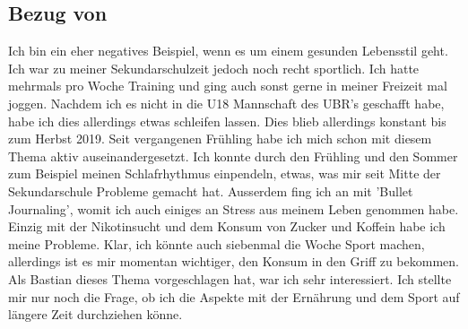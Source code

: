 \subsection{Bezug von \jonas}
\chapterauthor{\jonas}
\label{bezug:jonas}
Ich bin ein eher negatives Beispiel, wenn es um einem gesunden Lebensstil geht. Ich war zu meiner Sekundarschulzeit jedoch noch recht sportlich. Ich hatte mehrmals pro Woche Training und ging auch sonst gerne in meiner Freizeit mal joggen. Nachdem ich es nicht in die U18 Mannschaft des UBR's geschafft habe, habe ich dies allerdings etwas schleifen lassen.
\newline
Dies blieb allerdings konstant bis zum Herbst 2019. Seit vergangenen Frühling habe ich mich schon mit diesem Thema aktiv auseinandergesetzt. Ich konnte durch den Frühling und den Sommer zum Beispiel meinen Schlafrhythmus einpendeln, etwas, was mir seit Mitte der Sekundarschule Probleme gemacht hat. Ausserdem fing ich an mit 'Bullet Journaling', womit ich auch einiges an Stress aus meinem Leben genommen habe. Einzig mit der Nikotinsucht und dem Konsum von Zucker und Koffein habe ich meine Probleme. Klar, ich könnte auch siebenmal die Woche Sport machen, allerdings ist es mir momentan wichtiger, den Konsum in den Griff zu bekommen.
\newline
\newline
Als Bastian dieses Thema vorgeschlagen hat, war ich sehr interessiert. Ich stellte mir nur noch die Frage, ob ich die Aspekte mit der Ernährung und dem Sport auf längere Zeit durchziehen könne.